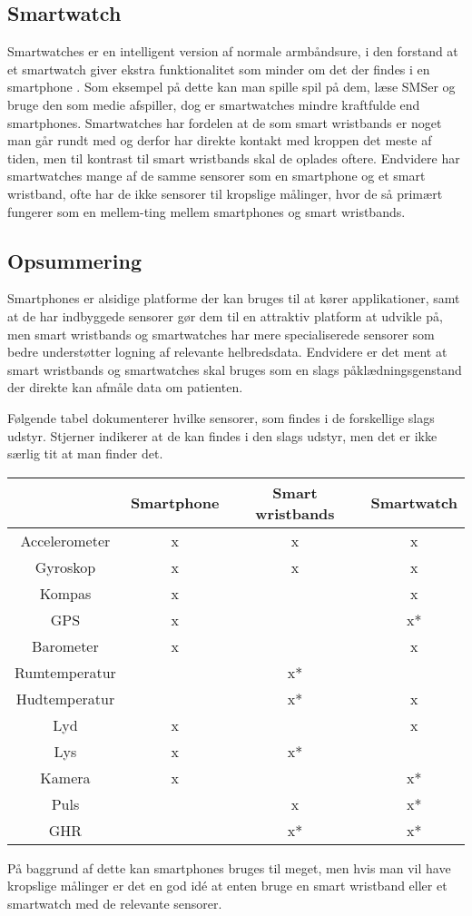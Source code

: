 \subsection{Smartwatch}
Smartwatches er en intelligent version af normale armbåndsure, i den forstand at et smartwatch giver ekstra funktionalitet som minder om det der findes i en smartphone \citep{msic:smartwatchstate}. 
Som eksempel på dette kan man spille spil på dem, læse SMSer og bruge den som medie afspiller, dog er smartwatches mindre kraftfulde end smartphones. 
Smartwatches har fordelen at de som smart wristbands er noget man går rundt med og derfor har direkte kontakt med kroppen det meste af tiden, men til kontrast til smart wristbands skal de oplades oftere. 
Endvidere har smartwatches mange af de samme sensorer som en smartphone og et smart wristband, ofte har de ikke sensorer til kropslige målinger, hvor de så primært fungerer som en mellem-ting mellem smartphones og smart wristbands.

\subsection{Opsummering}
Smartphones er alsidige platforme der kan bruges til at kører applikationer, samt at de har indbyggede sensorer gør dem til en attraktiv platform at udvikle på, men smart wristbands og smartwatches har mere specialiserede sensorer som bedre understøtter logning af relevante helbredsdata.
Endvidere er det ment at smart wristbands og smartwatches skal bruges som en slags påklædningsgenstand der direkte kan afmåle data om patienten.

Følgende tabel dokumenterer hvilke sensorer, som findes i de forskellige slags udstyr. Stjerner indikerer at de kan findes i den slags udstyr, men det er ikke særlig tit at man finder det. %

\begin{table}
\centering
\begin{tabular}{|c|c|c|c|}
\hline  			 & Smartphone 	& Smart wristbands 	& Smartwatch 	\\ 
\hline Accelerometer &  x		  	&  			x	 	&  		x  		\\ 
\hline Gyroskop		 &	x			&			x		&		x		\\
\hline Kompas		 &  x			&					&		x		\\
\hline GPS			 &	x			&					&		x*		\\
\hline Barometer	 &	x			&					&		x		\\
\hline Rumtemperatur &				&			x*		&				\\
\hline Hudtemperatur &				&			x*		&		x		\\
\hline Lyd			 &	x			&					&		x		\\
\hline Lys			 &	x			&			x*		&				\\
\hline Kamera		 &	x			&					&		x*		\\
\hline Puls			 &				&			x		&		x*		\\
\hline GHR			 &				&			x*		&		x*		\\ \hline
\end{tabular} 
\end{table}

På baggrund af dette kan smartphones bruges til meget, men hvis man vil have kropslige målinger er det en god idé at enten bruge en smart wristband eller et smartwatch med de relevante sensorer.